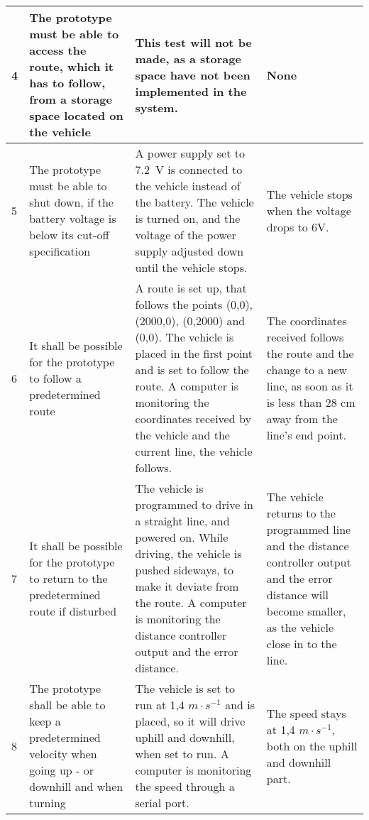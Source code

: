 \begin{table}[H]
\begin{tabular}{|p{2cm}|p{5cm}|p{6cm}|p{3cm}|}
\hline%
           4    &   The prototype must be able to access the route, which it has to follow, from a storage space located on the vehicle & This test will not be made, as a storage space have not been implemented in the system.   & None                 \\
\hline%
           5    &   The prototype must be able to shut down, if the battery voltage is below its cut-off specification &   A power supply set to \SI{7,2}{V} is connected to the vehicle instead of the battery. The vehicle is turned on, and the voltage of the power supply adjusted down until the vehicle stops.   &   The vehicle stops when the voltage drops to 6V.               \\
\hline%
           6    &   It shall be possible for the prototype to follow a predetermined route &   A route is set up, that follows the points (0,0), (2000,0), (0,2000) and (0,0). The vehicle is placed in the first point and is set to follow the route. A computer is monitoring the coordinates received by the vehicle and the current line, the vehicle follows.  &  The coordinates received follows the route and the change to a new line, as soon as it is less than 28 cm away from the line's end point. \\
\hline%
           7    &   It shall be possible for the prototype to return to the predetermined route if disturbed   &  The vehicle is programmed to drive in a straight line, and powered on. While driving, the vehicle is pushed sideways, to make it deviate from the route. A computer is monitoring the distance controller output and the error distance.    &   The vehicle returns to the programmed line and the distance controller output and the error distance will become smaller, as the vehicle close in to the line.            \\ 
\hline%
           8    &   The prototype shall be able to keep a predetermined velocity when going up - or downhill and when turning   &  The vehicle is set to run at 1,4 $m \cdot s^{-1}$ and is placed, so it will drive uphill and downhill, when set to run. A computer is monitoring the speed through a serial port.   &    The speed stays at 1,4 $m \cdot s^{-1}$, both on the uphill and downhill part.            \\
\hline%
\end{tabular}
\label{tab:AcceptTestTestProcedure}
\end{table}

